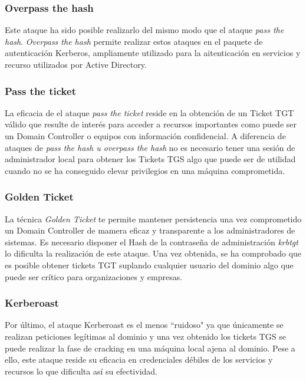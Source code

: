\subsubsection{Overpass the hash}
Este ataque ha sido posible realizarlo del mismo modo que el ataque {\it pass the hash}. {\it Overpass the hash} permite realizar estos ataques en el paquete de autenticación Kerberos, ampliamente utilizado para la aitenticación en servicios y recurso utilizados por Active Directory.
\subsubsection{Pass the ticket}
La eficacia de el ataque {\it pass the ticket} reside en la obtención de un Ticket TGT válido que resulte de interés para acceder a recursos importantes como puede ser un Domain Controller o equipos con información confidencial. A diferencia de ataques de {\it pass the hash u overpass the hash} no es necesario tener una sesión de administrador local para obtener los Tickets TGS algo que puede ser de utilidad cuando no se ha conseguido elevar privilegios en una máquina comprometida.
\subsubsection{Golden Ticket}
La técnica {\it Golden Ticket} te permite mantener persistencia una vez comprometido un Domain Controller de mamera eficaz y transparente a los administradores de sistemas. Es necesario disponer el Hash de la contraseña de administración {\it krbtgt} lo dificulta la realización de este ataque. Una vez obtenida, se ha comprobado que es posible obtener tickets TGT suplando cualquier usuario del dominio algo que puede ser crítico para organizaciones y empresas. 
\subsubsection{Kerberoast}
Por último, el ataque Kerberoast es el menos ``ruidoso" ya que únicamente se realizan peticiones legítimas al dominio y una vez obtenido los tickets TGS se puede realizar la fase de cracking en una máquina local ajena al dominio. Pese a ello, este ataque reside su eficacia en credenciales débiles de los servicios y recursos lo que dificulta así su efectividad. 
